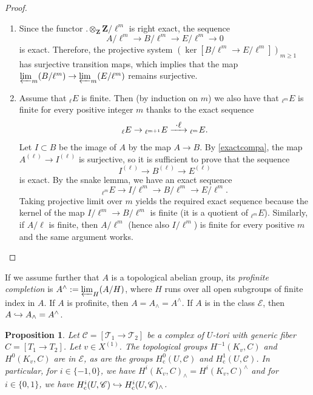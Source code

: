 \documentclass[10pt,a4paper]{amsart}
\newcommand{\skpt}{\smallskip}
\let\mathcal\mathscr
\newenvironment{enumeratea}
{\bgroup\def\theenumi{\alph{enumi}}\begin{enumerate}}
{\end{enumerate}\egroup}
\newcommand\hto{\mathrel{\lhook\joinrel\to}}
\newcommand\To[1]{\mathchoice{\xrightarrow{\textstyle\kern4pt#1\kern3pt}}{\stackrel{#1}{\longrightarrow}}{}{}}
\newcommand{\rc}{\mathrm{c}}
\theoremstyle{plain}
\newtheorem{prop}[theo]{Proposition}
\theoremstyle{definition}
\newcommand \ZZ {\mathbf{Z}}
\newcommand \cT {\mathcal{T}}
\newcommand \cC {\mathcal{C}}
\begin{document}
\skpt
\begin{proof}
\begin{enumeratea}
\item
Since the functor $. \otimes_{\ZZ} \ZZ/\ell^m$ is right exact,
the sequence
\[
A/\ell^m \to B/\ell^m \to E/\ell^m \to 0
\]
is exact. Therefore, the projective system
$(\ker [B/\ell^m \to E/\ell^m])_{m \geq 1}$
has surjective transition maps, which
implies that the map $\varprojlim_m (B/\ell^m) \to \varprojlim_m (E/\ell^m)$
remains surjective.

\item
Assume that $_{\ell} E $ is finite. Then
(by induction on $m$) we also have that $_{\ell^m} E$ is finite
for every positive integer $m$ thanks to the exact sequence
\[
_{\ell} E \to{}_{\ell^{m+1}} E \To{\cdot\ell}{}_{\ell^m} E.
\]
Let $I \subset B$ be the image of $A$ by the map $A \to B$.
By \eqref{exactcompa}, the map $A^{(\ell)} \to I^{(\ell)}$ is surjective, so
it is sufficient to prove that the sequence
\[
I^{(\ell)} \to B^{(\ell)} \to E^{(\ell)}
\]
is exact. By the snake lemma, we have an exact sequence
\[
_{\ell^m} E \to I/\ell^m \to B/\ell^m \to E/\ell^m.
\]
Taking projective limit over $m$ yields the required exact sequence
because the kernel of the map $I/\ell^m \to B/\ell^m$ is finite
(it is a quotient of $_{\ell^m} E$). Similarly, if $A/\ell$ is finite,
then $A/\ell^m$ (hence also $I/\ell^m$) is finite for every positive
$m$ and the same argument works.\qedhere
\end{enumeratea}
\end{proof}

If we assume further that $A$ is a topological
abelian group, its \emph{profinite completion} is
$A^{\wedge}:=\varprojlim_H (A/H)$,
where $H$ runs over all open subgroups of finite index
in $A$. If $A$ is profinite, then $A=A_{\wedge}=A^{\wedge}$. If $A$ is in
the class $\mathcal E$, then $A \hto A_{\wedge}=A^{\wedge}$.

\begin{prop} \label{injectcompl}
Let $\mathcal C=[\cT_1 \to \cT_2]$ be a complex of $U$-tori with generic fiber
$C=[T_1 \to T_2]$. Let $v \in X^{(1)}$.
The topological groups $H^{-1}(K_v,C)$ and $H^0(K_v,C)$ are
in $\mathcal E$, as are
the groups $H^0_\rc(U,\cC)$ and $H^1_\rc(U,\cC)$. In particular, for
$i \in \{-1, 0\}$, we have $H^i(K_v,C)_{\wedge}=H^i(K_v,C)^{\wedge}$
and for $i \in \{0, 1\}$, we have $H^i_\rc(U,\cC) \hto
H^i_\rc(U,\cC)_{\wedge}$.
\end{prop}
\end{document}
